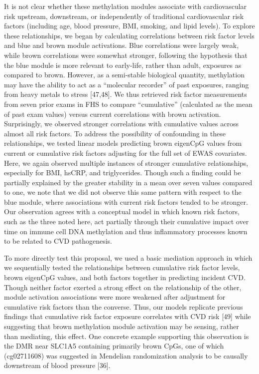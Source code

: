\documentclass[]{bmcart}
\begin{document}
It is not clear whether these methylation modules associate with
cardiovascular risk upstream, downstream, or independently of
traditional cardiovascular risk factors (including age, blood pressure,
BMI, smoking, and lipid levels). To explore these relationships, we
began by calculating correlations between risk factor levels and blue
and brown module activations. Blue correlations were largely weak,
while brown correlations were somewhat stronger, following the
hypothesis that the blue module is more relevant to early-life, rather
than adult, exposures as compared to brown. However, as a semi-stable
biological quantity, methylation may have the ability to act as a
``molecular recorder'' of past exposures, ranging from heavy metals to
stress {[}47,48{]}. We thus retrieved risk factor measurements from
seven prior exams in FHS to compare ``cumulative'' (calculated as the
mean of past exam values) versus current correlations with brown
activation. Surprisingly, we observed stronger correlations with
cumulative values across almost all risk factors. To address the
possibility of confounding in these relationships, we tested linear
models predicting brown eigenCpG values from current or cumulative risk
factors adjusting for the full set of EWAS covariates. Here, we again
observed multiple instances of stronger cumulative relationships,
especially for BMI, hsCRP, and triglycerides. Though such a finding
could be partially explained by the greater stability in a mean over
seven values compared to one, we note that we did not observe this same
pattern with respect to the blue module, where associations with current
risk factors tended to be stronger. Our observation agrees with a
conceptual model in which known risk factors, such as the three noted
here, act partially through their cumulative impact over time on immune
cell DNA methylation and thus inflammatory processes known to be related
to CVD pathogenesis.

To more directly test this proposal, we used a basic mediation approach
in which we sequentially tested the relationships between cumulative
risk factor levels, brown eigenCpG values, and both factors together in
predicting incident CVD. Though neither factor exerted a strong effect
on the relationship of the other, module activation associations were
more weakened after adjustment for cumulative risk factors than the
converse. Thus, our models replicate previous findings that cumulative
risk factor exposure correlates with CVD risk {[}49{]} while suggesting
that brown methylation module activation may be sensing, rather than
mediating, this effect. One concrete example supporting this observation
is the DMR near SLC1A5 containing primarily brown CpGs, one of which
(cg02711608) was suggested in Mendelian randomization analysis to be
causally downstream of blood pressure {[}36{]}.
\end{document}
